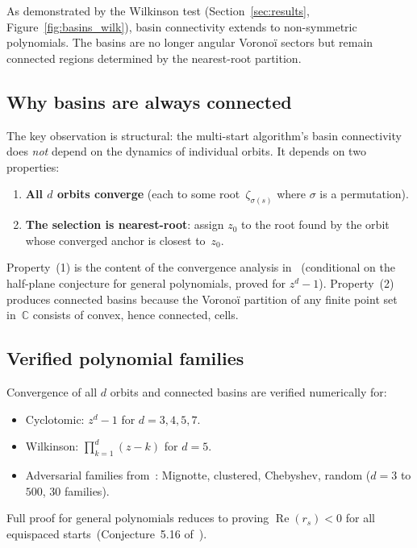 \documentclass[11pt,a4paper]{article}
\theoremstyle{definition}
\theoremstyle{remark}
\begin{document}
As demonstrated by the Wilkinson test (Section~\ref{sec:results}, Figure~\ref{fig:basins_wilk}), basin connectivity extends to non-symmetric polynomials.  The basins are no longer angular Vorono\"i sectors but remain connected regions determined by the nearest-root partition.

\subsection{Why basins are always connected}

The key observation is structural: the multi-start algorithm's basin connectivity does \emph{not} depend on the dynamics of individual orbits.  It depends on two properties:
\begin{enumerate}[nosep]
\item \textbf{All $d$ orbits converge} (each to some root~$\zeta_{\sigma(s)}$ where $\sigma$ is a permutation).
\item \textbf{The selection is nearest-root}: assign $z_0$ to the root found by the orbit whose converged anchor is closest to~$z_0$.
\end{enumerate}
Property~(1) is the content of the convergence analysis in~\cite{Besevic2026g} (conditional on the half-plane conjecture for general polynomials, proved for $z^d - 1$).  Property~(2) produces connected basins because the Vorono\"i partition of any finite point set in~$\mathbb{C}$ consists of convex, hence connected, cells.

\subsection{Verified polynomial families}

Convergence of all $d$ orbits and connected basins are verified numerically for:
\begin{itemize}[nosep]
\item Cyclotomic: $z^d - 1$ for $d = 3, 4, 5, 7$.
\item Wilkinson: $\prod_{k=1}^d (z - k)$ for $d = 5$.
\item Adversarial families from~\cite{Besevic2026g}: Mignotte, clustered, Chebyshev, random ($d = 3$ to $500$, $30$ families).
\end{itemize}
Full proof for general polynomials reduces to proving $\operatorname{Re}(r_s) < 0$ for all equispaced starts~(Conjecture~5.16 of~\cite{Besevic2026g}).

\end{document}
